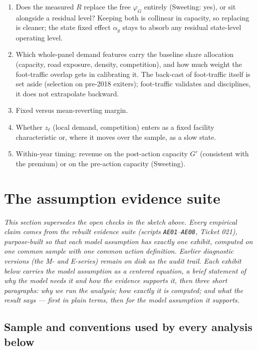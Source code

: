 \documentclass[
  letterpaper,
  DIV=11,
  numbers=noendperiod]{scrartcl}
\providecommand{\tightlist}{%
  \setlength{\itemsep}{0pt}\setlength{\parskip}{0pt}}\usepackage{longtable,booktabs,array}
\begin{document}
\begin{enumerate}
\def\labelenumi{\arabic{enumi}.}
\tightlist
\item
  Does the measured \(R\) replace the free \(\varphi_G\) entirely
  (Sweeting: yes), or sit alongside a residual level? Keeping both is
  collinear in capacity, so replacing is cleaner; the state fixed effect
  \(\alpha_g\) stays to absorb any residual state-level operating level.
\item
  Which whole-panel demand features carry the baseline share allocation
  (capacity, road exposure, density, competition), and how much weight
  the foot-traffic overlap gets in calibrating it. The back-cast of
  foot-traffic itself is set aside (selection on pre-2018 exiters);
  foot-traffic validates and disciplines, it does not extrapolate
  backward.
\item
  Fixed versus mean-reverting margin.
\item
  Whether \(z_\ell\) (local demand, competition) enters as a fixed
  facility characteristic or, where it moves over the sample, as a slow
  state.
\item
  Within-year timing: revenue on the post-action capacity \(G'\)
  (consistent with the premium) or on the pre-action capacity
  (Sweeting).
\end{enumerate}

\newpage

\section{The assumption evidence suite}\label{sec-ae}

\emph{This section supersedes the open checks in the sketch above. Every
empirical claim comes from the rebuilt evidence suite (scripts
\texttt{AE01}--\texttt{AE08}, Ticket 021), purpose-built so that each
model assumption has exactly one exhibit, computed on one common sample
with one common action definition. Earlier diagnostic versions (the M-
and E-series) remain on disk as the audit trail. Each exhibit below
carries the model assumption as a centered equation, a brief statement
of why the model needs it and how the evidence supports it, then three
short paragraphs: why we run the analysis; how exactly it is computed;
and what the result says --- first in plain terms, then for the model
assumption it supports.}

\subsection{Sample and conventions used by every analysis
below}\label{sec-ae-conventions}
\end{document}
